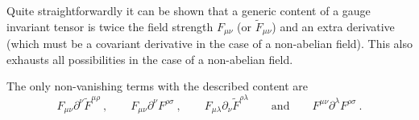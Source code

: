 \documentclass[12pt]{revtex4}
\begin{document}
	Quite straightforwardly it can be shown that a generic content of a gauge
	invariant tensor is twice the field strength  $ F_{\mu\nu} $ (or 
	$ \widetilde{F}_{\mu\nu} $) and an extra derivative 
	(which must be a covariant derivative in the case of a non-abelian field).
	This also exhausts all possibilities in the case of a non-abelian
	field.


	The only non-vanishing terms with the described content are
\begin{equation}
\label{generic_gauge}
	F_{\mu\nu} \partial^\nu \widetilde{F}^{\mu\rho}~,\qquad
	F_{\mu\nu} \partial^\nu F^{\rho\sigma}~,\qquad
	F_{\mu\lambda} \partial_\nu \widetilde{F}^{\rho\lambda}\qquad
	\text{and}\qquad
	F^{\mu\nu} \partial^\lambda F^{\rho\sigma}~.
\end{equation}
	
\end{document}
